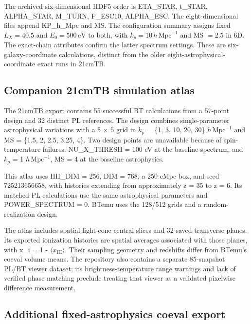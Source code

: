 The archived six-dimensional HDF5 order is ETA\_STAR, t\_STAR, ALPHA\_STAR, M\_TURN, F\_ESC10, ALPHA\_ESC. The eight-dimensional files append KP\_h\_Mpc and MS. The configuration summary assigns fixed $L_X=40.5$ and $E_0=500\,\mathrm{eV}$ to both, with $k_p=10\,h\,\mathrm{Mpc}^{-1}$ and MS $=2.5$ in 6D. The exact-chain attributes confirm the latter spectrum settings. These are six-galaxy-coordinate calculations, distinct from the older eight-astrophysical-coordinate exact runs in 21cmTB.

\subsection{Companion 21cmTB simulation atlas}\label{companion-21cmtb-simulation-atlas}

The \href{https://github.com/HainaHuang729/21cmTB}{21cmTB export} contains 55 successful BT calculations from a 57-point design and 32 distinct PL references. The design combines single-parameter astrophysical variations with a 5 \(\times\) 5 grid in \ensuremath{k_p} = \{1, 3, 10, 20, 30\} $h\,\mathrm{Mpc}^{-1}$ and MS = \{1.5, 2, 2.5, 3.25, 4\}. Two design points are unavailable because of spin-temperature failures: NU\_X\_THRESH = 100 eV at the baseline spectrum, and \ensuremath{k_p} = 1 $h\,\mathrm{Mpc}^{-1}$, MS = 4 at the baseline astrophysics.

This atlas uses HII\_DIM = 256, DIM = 768, a 250 cMpc box, and seed 725213656658, with histories extending from approximately z = 35 to z = 6. Its matched PL calculations use the same astrophysical parameters and POWER\_SPECTRUM = 0. BTemu uses the 128/512 grids and a random-realization design.

The atlas includes spatial light-cone central slices and 32 saved transverse planes. Its exported ionization histories are spatial averages associated with those planes, with x\_i = 1 - \(\langle\)\ensuremath{x_{\mathrm{HI}}}\(\rangle\). Their sampling geometry and redshifts differ from BTemu's coeval volume means. The repository also contains a separate 85-snapshot PL/BT viewer dataset; its brightness-temperature range warnings and lack of verified phase matching preclude treating that viewer as a validated pixelwise difference measurement.

\subsection{Additional fixed-astrophysics coeval export}\label{app:fixed-astro-update}

